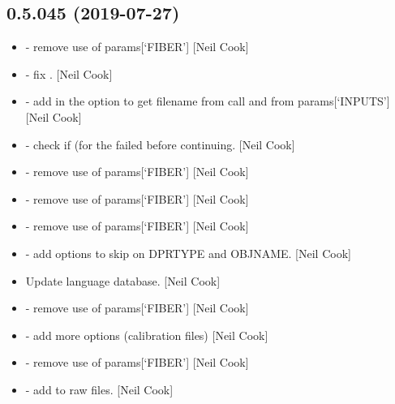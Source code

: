 \documentclass[a4paper,10pt,english]{report}
\begin{document}
\subsection{0.5.045 (2019-07-27)}
\label{\detokenize{misc/changelog:id97}}\begin{itemize}
\item {} 
 - remove use of params{[}‘FIBER’{]} {[}Neil
Cook{]}

\item {} 
 - fix . {[}Neil Cook{]}

\item {} 
 - add in the option to get filename from call and from
params{[}‘INPUTS’{]} {[}Neil Cook{]}

\item {} 
 - check if  (for the 
failed before continuing. {[}Neil Cook{]}

\item {} 
 - remove use of params{[}‘FIBER’{]} {[}Neil Cook{]}

\item {} 
 - remove use of params{[}‘FIBER’{]} {[}Neil Cook{]}

\item {} 
 - remove use of params{[}‘FIBER’{]} {[}Neil Cook{]}

\item {} 
 - add options to skip on DPRTYPE and OBJNAME.
{[}Neil Cook{]}

\item {} 
Update language database. {[}Neil Cook{]}

\item {} 
 - remove use of params{[}‘FIBER’{]} {[}Neil Cook{]}

\item {} 
 - add more options (calibration files) {[}Neil
Cook{]}

\item {} 
 - remove use of params{[}‘FIBER’{]} {[}Neil Cook{]}

\item {} 
 - add  to raw files. {[}Neil Cook{]}


\end{itemize}
\end{document}
